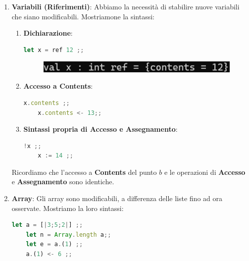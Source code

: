 \documentclass{article}
\begin{document}
\begin{enumerate}
    \item \textbf{Variabili (Riferimenti)}: Abbiamo la necessità di stabilire nuove variabili che siano modificabili. Mostriamone la sintassi:

\begin{enumerate}
\item \textbf{Dichiarazione}:
    \vspace*{10px}
\begin{lstlisting}[language = JavaScript]
    let x = ref 12 ;;
\end{lstlisting}

\begin{figure}[htbp]
    \center
    \includegraphics[scale=0.35]{img/ref1.png}
\end{figure}

\vspace*{-5px}
\item \textbf{Accesso a Contents}:
\vspace*{10px}
\begin{lstlisting}[language = JavaScript]
    x.contents ;;
    x.contents <- 13;;
\end{lstlisting}
\vspace*{-20px}
\item \textbf{Sintassi propria di Accesso e Assegnamento}:
\vspace*{10px}
\begin{lstlisting}[language = JavaScript]
    !x ;;
    x := 14 ;;
\end{lstlisting}
\vspace*{-20px}
\end{enumerate}

Ricordiamo che l'accesso a \textbf{Contents} del punto $b$ e le operazioni di \textbf{Accesso} e \textbf{Assegnamento} sono identiche.

\vspace*{15px}

\item \textbf{Array}: Gli array sono modificabili, a differenza delle liste fino ad ora osservate. Mostriamo la loro sintassi:

\begin{lstlisting}[language = JavaScript]
    let a = [|3;5;2|] ;;
    let n = Array.length a;;
    let e = a.(1) ;;
    a.(1) <- 6 ;; 
\end{lstlisting}
\vspace*{-20px}


\end{enumerate}
\end{document}
